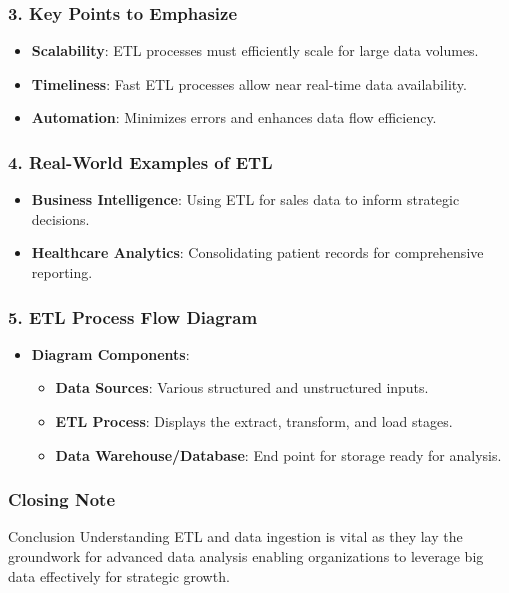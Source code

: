 \documentclass[aspectratio=169]{beamer}
\begin{document}
\begin{frame}[fragile]
    \frametitle{3. Key Points to Emphasize}
    \begin{itemize}
        \item \textbf{Scalability}: ETL processes must efficiently scale for large data volumes.
        \item \textbf{Timeliness}: Fast ETL processes allow near real-time data availability.
        \item \textbf{Automation}: Minimizes errors and enhances data flow efficiency.
    \end{itemize}
\end{frame}

\begin{frame}[fragile]
    \frametitle{4. Real-World Examples of ETL}
    \begin{itemize}
        \item \textbf{Business Intelligence}: Using ETL for sales data to inform strategic decisions.
        \item \textbf{Healthcare Analytics}: Consolidating patient records for comprehensive reporting.
    \end{itemize}
\end{frame}

\begin{frame}[fragile]
    \frametitle{5. ETL Process Flow Diagram}
    \begin{itemize}
        \item \textbf{Diagram Components}:
        \begin{itemize}
            \item \textbf{Data Sources}: Various structured and unstructured inputs.
            \item \textbf{ETL Process}: Displays the extract, transform, and load stages.
            \item \textbf{Data Warehouse/Database}: End point for storage ready for analysis.
        \end{itemize}
    \end{itemize}
\end{frame}

\begin{frame}[fragile]
    \frametitle{Closing Note}
    \begin{block}{Conclusion}
        Understanding ETL and data ingestion is vital as they lay the groundwork for advanced data analysis enabling organizations to leverage big data effectively for strategic growth.
    \end{block}
\end{frame}
\end{document}
